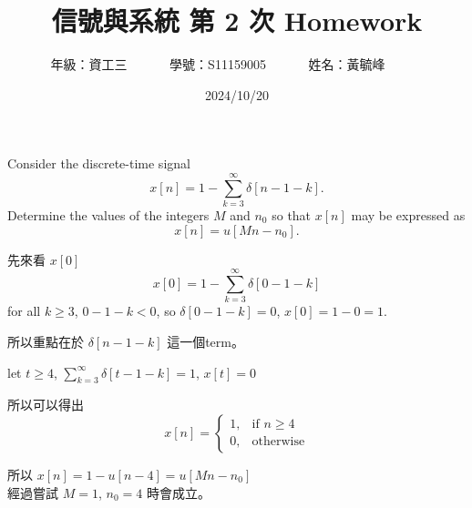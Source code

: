 \documentclass[12pt,a4paper]{article}
\begin{document}
\title{
  {
    \heiti 信號與系統 第 2 次 Homework
  }
}


\date{2024/10/20}
\author{
  年級：{資工三}~~~~~~
  學號：{S11159005}~~~~~~
  姓名：{黃毓峰}~~~~~~
}

\maketitle
\newlength{\question}
\settowidth{\question}{XX}

\section*{\heiti \color{black}{Question - 1.12}}

\parbox[t]{\dimexpr\linewidth-\question}{
  Consider the discrete-time signal
  \[
    x[n] = 1 - \sum_{k=3}^{\infty} \delta[n - 1 - k].
  \]
      Determine the values of the integers \(M\) and \(n_0\) so that \(x[n]\) may be expressed as
  \[
  x[n] = u[Mn - n_0].
  \]
  
}


\parbox[t]{\dimexpr\linewidth-\question} {
  先來看 \(x[0]\)
  \[
    x[0] = 1 - \sum_{k=3}^{\infty} \delta[0 - 1 - k]
  \]
  for all \(k \geq 3\), \(0 - 1 - k < 0\), so \(\delta[0 - 1 - k] = 0\),
  \(
    x[0] = 1 - 0 = 1.
  \)

  所以重點在於 \(\delta[n - 1 - k]\) 這一個term。

  let \(t \geq 4\),  \(\sum_{k=3}^{\infty} \delta[t - 1 - k] = 1\),  \(x[t] = 0\)

  所以可以得出
  \[
    x[n] = 
      \begin{cases}
          1,              & \text{if } n\geq 4\\
          0,              & \text{otherwise}
      \end{cases}
  \]

  所以 \(x[n]=1- u[n-4]=u[Mn-n_0]\)\\
  經過嘗試\footnotemark{} \(M = 1\), \(n_0 = 4\) 時會成立。
}

\newpage

\section*{\heiti \color{black}{Question - 1.15}}
\end{document}
